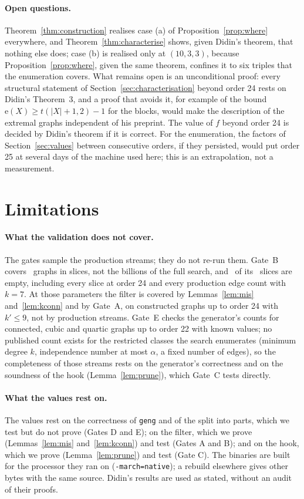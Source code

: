 \documentclass[11pt]{article}
\theoremstyle{definition}
\theoremstyle{remark}
\newcommand{\e}{\mathrm{e}}
\begin{document}
\paragraph{Open questions.} Theorem~\ref{thm:construction} realises case (a) of Proposition~\ref{prop:where}
everywhere, and Theorem~\ref{thm:characterise} shows, given Didin's theorem, that nothing else does; case (b) is
realised only at $(10,3,3)$, because Proposition~\ref{prop:where}, given the same theorem, confines it to six triples that the enumeration
covers. What remains open is an unconditional proof: every structural statement of Section~\ref{sec:characterisation} beyond
order 24 rests on Didin's Theorem~3, and a proof that avoids it, for example of the bound $\e(X)\ge t(|X|+1,2)-1$ for
the blocks, would make the description of the extremal graphs independent of his preprint. The value of $f$ beyond order 24 is decided by Didin's theorem if it is correct. For the
enumeration, the factors of Section~\ref{sec:values} between consecutive orders, if they persisted, would put
order 25 at several days of the machine used here; this is an extrapolation, not a measurement.


\section{Limitations}\label{sec:limitations}

\paragraph{What the validation does not cover.} The gates sample the production streams; they do not re-run them.
Gate~B covers \gateBgraphs\ graphs in slices, not the billions of the full search, and \gateBempty\ of its
\gateBslices\ slices are empty, including every slice at order 24 and every production edge count with $k=7$. At those
parameters the filter is covered by Lemmas~\ref{lem:mis} and~\ref{lem:kconn} and by Gate~A, on constructed graphs up to
order 24 with $k'\le9$, not by production streams. Gate~E checks the generator's counts for
connected, cubic and quartic graphs up to order 22 with known values; no published count exists for the restricted
classes the search enumerates (minimum degree $k$, independence number at most $\alpha$, a fixed number of edges), so
the completeness of those streams rests on the generator's correctness and on the soundness of the hook
(Lemma~\ref{lem:prune}), which Gate~C tests directly.

\paragraph{What the values rest on.} The values rest on the correctness of \texttt{geng} and of the split into parts, which we test
but do not prove (Gates D and E); on the filter, which we prove (Lemmas~\ref{lem:mis} and~\ref{lem:kconn}) and test
(Gates A and B); and on the hook, which we prove (Lemma~\ref{lem:prune}) and test (Gate C). The binaries are built for
the processor they ran on (\texttt{-march=native}); a rebuild elsewhere gives other bytes with the same source.
Didin's results are used as stated, without an audit of their proofs.
\end{document}
